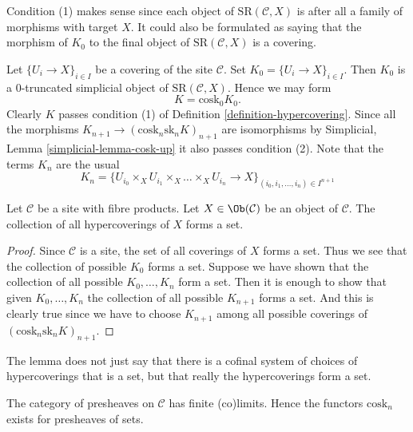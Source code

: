 \noindent
Condition (1) makes sense since each object of
$\text{SR}(\mathcal{C}, X)$ is after all a family
of morphisms with target $X$. It could also be
formulated as saying that the morphism of $K_0$ to
the final object of $\text{SR}(\mathcal{C}, X)$
is a covering.

\begin{example}
\label{example-cech}
Let $\{U_i \to X\}_{i \in I}$ be a covering of the site $\mathcal{C}$.
Set $K_0 = \{U_i \to X\}_{i \in I}$.
Then $K_0$ is a $0$-truncated simplicial object of
$\text{SR}(\mathcal{C}, X)$. Hence we may form
$$
K = \text{cosk}_0 K_0.
$$
Clearly $K$ passes condition (1) of Definition \ref{definition-hypercovering}.
Since all the morphisms $K_{n + 1} \to (\text{cosk}_n \text{sk}_n K)_{n + 1}$
are isomorphisms by
Simplicial, Lemma \ref{simplicial-lemma-cosk-up}
it also passes condition (2). Note that
the terms $K_n$ are the usual
$$
K_n = \{
U_{i_0} \times_X U_{i_1} \times_X \ldots \times_X U_{i_n} \to X
\}_{(i_0, i_1, \ldots, i_n) \in I^{n + 1}}
$$
\end{example}

\begin{lemma}
\label{lemma-hypercoverings-set}
Let $\mathcal{C}$ be a site with fibre products.
Let $X \in \Ob(\mathcal{C})$ be an object of $\mathcal{C}$.
The collection of all hypercoverings of $X$ forms a set.
\end{lemma}

\begin{proof}
Since $\mathcal{C}$ is a site, the set of all coverings of
$X$ forms a set. Thus we see that the collection
of possible $K_0$ forms a set. Suppose we have shown that
the collection of all possible $K_0, \ldots, K_n$ form
a set. Then it is enough to show that given
$K_0, \ldots, K_n$ the collection of all possible
$K_{n + 1}$ forms a set. And this is clearly true since
we have to choose $K_{n + 1}$ among all possible coverings
of $(\text{cosk}_n \text{sk}_n K)_{n + 1}$.
\end{proof}

\begin{remark}
\label{remark-hypercoverings-really-set}
The lemma does not just say that there is a cofinal
system of choices of hypercoverings that is a set,
but that really the hypercoverings form a set.
\end{remark}

\noindent
The category of presheaves on $\mathcal{C}$ has
finite (co)limits. Hence the functors $\text{cosk}_n$
exists for presheaves of sets.

